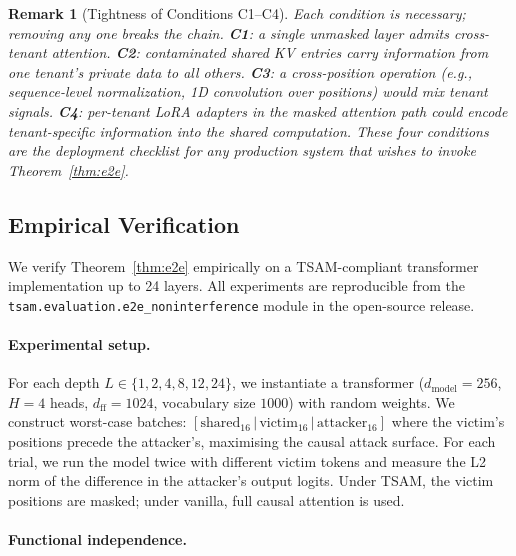 \documentclass[11pt]{article}
\newtheorem{remark}{Remark}
\begin{document}
\begin{remark}[Tightness of Conditions C1--C4]
\label{rem:tightness}
Each condition is necessary; removing any one breaks the chain.
\textbf{C1}: a single unmasked layer admits cross-tenant attention.
\textbf{C2}: contaminated shared KV entries carry information from one
tenant's private data to all others.
\textbf{C3}: a cross-position operation (e.g., sequence-level
normalization, 1D convolution over positions) would mix tenant signals.
\textbf{C4}: per-tenant LoRA adapters in the masked attention path could
encode tenant-specific information into the shared computation.  These
four conditions are the deployment checklist for any production system
that wishes to invoke Theorem~\ref{thm:e2e}.
\end{remark}

\subsection{Empirical Verification}
\label{sec:e2e:empirical}

We verify Theorem~\ref{thm:e2e} empirically on a TSAM-compliant transformer
implementation up to 24 layers.  All experiments are reproducible from the
\texttt{tsam.evaluation.e2e\_noninterference} module in the open-source
release.

\paragraph{Experimental setup.}
For each depth $L \in \{1, 2, 4, 8, 12, 24\}$, we instantiate a transformer
($d_{\mathrm{model}} = 256$, $H = 4$ heads, $d_{\mathrm{ff}} = 1024$,
vocabulary size $1000$) with random weights.  We construct worst-case
batches:
$[\text{shared}_{16}\,|\,\text{victim}_{16}\,|\,\text{attacker}_{16}]$
where the victim's positions precede the attacker's, maximising the causal
attack surface.  For each trial, we run the model twice with different
victim tokens and measure the L2 norm of the difference in the attacker's
output logits.  Under TSAM, the victim positions are masked; under vanilla,
full causal attention is used.

\paragraph{Functional independence.}
\end{document}
